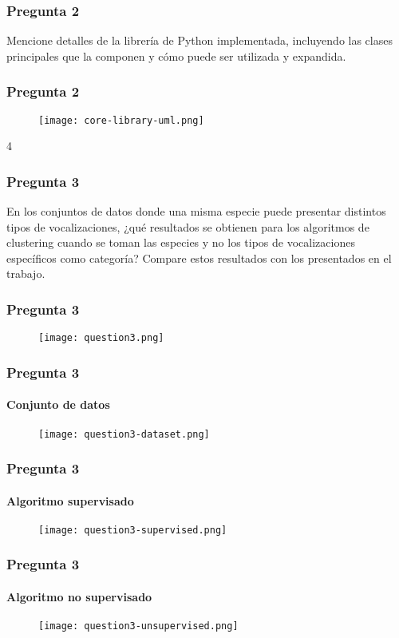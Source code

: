 \begin{frame}
    \frametitle{Pregunta 2}

    Mencione detalles de la librería de Python implementada, incluyendo las clases principales que la componen y cómo puede ser utilizada y expandida.

\end{frame}

\begin{frame}
    \frametitle{Pregunta 2}

    \begin{figure}[!h]
        \centering
        \texttt{[image: core-library-uml.png]}
    \end{figure}4

\end{frame}

\begin{frame}
    \frametitle{Pregunta 3}

    En los conjuntos de datos donde una misma especie puede presentar distintos tipos de vocalizaciones, ¿qué resultados se obtienen para los algoritmos de clustering cuando se toman las especies y no los tipos de vocalizaciones específicos como categoría?
    Compare estos resultados con los presentados en el trabajo.

\end{frame}

\begin{frame}
    \frametitle{Pregunta 3}

    \begin{figure}[!h]
        \centering
        \texttt{[image: question3.png]}
    \end{figure}

\end{frame}

\begin{frame}
    \frametitle{Pregunta 3}
    \framesubtitle{Conjunto de datos}

    \begin{figure}[!h]
        \centering
        \texttt{[image: question3-dataset.png]}
    \end{figure}

\end{frame}

\begin{frame}
    \frametitle{Pregunta 3}
    \framesubtitle{Algoritmo supervisado}

    \begin{figure}[!h]
        \centering
        \texttt{[image: question3-supervised.png]}
    \end{figure}

\end{frame}

\begin{frame}
    \frametitle{Pregunta 3}
    \framesubtitle{Algoritmo no supervisado}

    \begin{figure}[!h]
        \centering
        \texttt{[image: question3-unsupervised.png]}
    \end{figure}

\end{frame}
